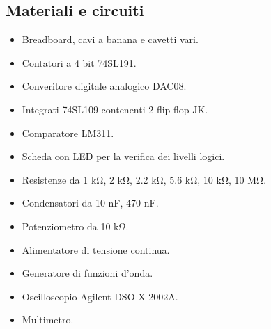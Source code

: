 \subsection{Materiali e circuiti}

\begin{itemize}
    \item{Breadboard, cavi a banana e cavetti vari.}
    \item{Contatori a 4 bit 74SL191.}
    \item{Converitore digitale analogico DAC08.}
    \item{Integrati 74SL109 contenenti 2 flip-flop JK.}
    \item{Comparatore LM311.}
    \item{Scheda con LED per la verifica dei livelli logici.}
    \item{Resistenze da 1 \si{\kilo\ohm}, 2 \si{\kilo\ohm}, 2.2 \si{\kilo\ohm}, 5.6 \si{\kilo\ohm}, 10 \si{\kilo\ohm}, 10 \si{\mega\ohm}.}
    \item{Condensatori da 10 nF, 470 nF.}
    \item{Potenziometro da 10 \si{\kilo\ohm}.}
    \item{Alimentatore di tensione continua.}
    \item{Generatore di funzioni d'onda.}
    \item{Oscilloscopio Agilent DSO-X 2002A.}
    \item{Multimetro.}
\end{itemize}
